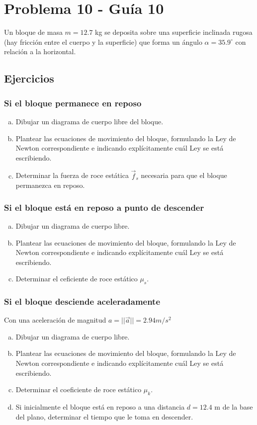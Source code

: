 \documentclass[12pt,tikz,border=3.14mm]{article}
\begin{document}
\section{Problema 10 - Guía 10}
	Un bloque de masa $m = 12.7$ kg se deposita sobre una superficie inclinada rugosa (hay fricción entre el cuerpo y la superficie) que forma un ángulo $\alpha = 35.9^{\circ}$ con relación a la horizontal.
			\subsection*{Ejercicios}
			
				\subsubsection*{Si el bloque permanece en reposo}
					\begin{enumerate}[a),leftmargin=1cm]
						\item Dibujar un diagrama de cuerpo libre del bloque.
						\item Plantear las ecuaciones de movimiento del bloque, formulando la Ley de Newton correspondiente e indicando explícitamente cuál Ley se está escribiendo.
						\item Determinar la fuerza de roce estática $\vec{f}_{s}$ necesaria para que el bloque permanezca en reposo.
					\end{enumerate}
				\subsubsection*{Si el bloque está en reposo a punto de descender}
					\begin{enumerate}[a),leftmargin=1cm]
						\item Dibujar un diagrama de cuerpo libre.
						\item Plantear las ecuaciones de movimiento del bloque, formulando la Ley de Newton correspondiente e indicando explícitamente cuál Ley se está escribiendo.
						\item Determinar el ceficiente de roce estático $\mu_{s}$.
					\end{enumerate}
				\subsubsection*{Si el bloque desciende aceleradamente}
					Con una aceleración de magnitud $a = || \vec{a} || = 2.94 m/s^{2}$
						\begin{enumerate}[a),leftmargin=2cm]
							\item Dibujar un diagrama de cuerpo libre.
							\item Plantear las ecuaciones de movimiento del bloque, formulando la Ley de Newton correspondiente e indicando explícitamente cuál Ley se está escribiendo.
							\item Determinar el coeficiente de roce estático $\mu_{k}$.
							\item Si inicialmente el bloque está en reposo a una distancia $d = 12.4$ m de la base del plano, determinar el tiempo que le toma en descender.
						\end{enumerate}
\end{document}
